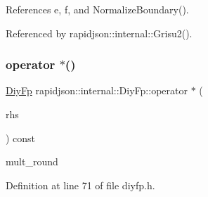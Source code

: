 References e, f, and Normalize\+Boundary().



Referenced by rapidjson\+::internal\+::\+Grisu2().

\mbox{\label{structrapidjson_1_1internal_1_1_diy_fp_a9e2033aa6047bcb08f763a6e43c11f3b}} 
\subsubsection{\texorpdfstring{operator $\ast$()}{operator *()}}
{\footnotesize\ttfamily \mbox{\hyperlink{structrapidjson_1_1internal_1_1_diy_fp}{Diy\+Fp}} rapidjson\+::internal\+::\+Diy\+Fp\+::operator $\ast$ (\begin{DoxyParamCaption}\item[{const \mbox{\hyperlink{structrapidjson_1_1internal_1_1_diy_fp}{Diy\+Fp}} \&}]{rhs }\end{DoxyParamCaption}) const}

mult\+\_\+round 

Definition at line 71 of file diyfp.\+h.


